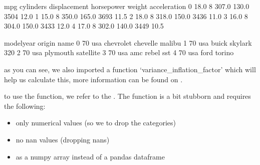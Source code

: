 \documentclass[letterpaper,10pt,english]{jupyterBook}
\begin{document}
\begin{sphinxVerbatim}[commandchars=\\\{\}]
\end{sphinxVerbatim}

\begin{sphinxVerbatim}[commandchars=\\\{\}]
    mpg  cylinders  displacement  horsepower  weight  acceleration  \PYGZbs{}
0  18.0          8         307.0       130.0    3504          12.0   
1  15.0          8         350.0       165.0    3693          11.5   
2  18.0          8         318.0       150.0    3436          11.0   
3  16.0          8         304.0       150.0    3433          12.0   
4  17.0          8         302.0       140.0    3449          10.5   

   model\PYGZus{}year origin                       name  
0          70    usa  chevrolet chevelle malibu  
1          70    usa          buick skylark 320  
2          70    usa         plymouth satellite  
3          70    usa              amc rebel sst  
4          70    usa                ford torino  
\end{sphinxVerbatim}

\sphinxAtStartPar
as you can see, we also imported a function ‘variance\_inflation\_factor’ which will help us calculate this, more information can be found on .

\sphinxAtStartPar
to use the function, we refer to the . The function is a bit stubborn and requires the following:
\begin{itemize}
\item {} 
\sphinxAtStartPar
only numerical values (so we to drop the categories)

\item {} 
\sphinxAtStartPar
no nan values (dropping nans)

\item {} 
\sphinxAtStartPar
as a numpy array instead of a pandas dataframe

\end{itemize}
\end{document}
